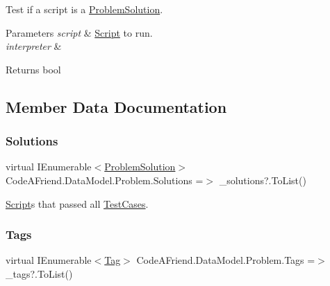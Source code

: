 Test if a script is a \mbox{\hyperlink{class_code_a_friend_1_1_data_model_1_1_problem_solution}{Problem\+Solution}}. 


\begin{DoxyParams}{Parameters}
{\em script} & \mbox{\hyperlink{class_code_a_friend_1_1_data_model_1_1_script}{Script}} to run.\\
\hline
{\em interpreter} & \\
\hline
\end{DoxyParams}
\begin{DoxyReturn}{Returns}
bool
\end{DoxyReturn}


\subsection{Member Data Documentation}
\mbox{\label{class_code_a_friend_1_1_data_model_1_1_problem_a3bebdf4e45042e9476fd7ae7cf38738b}} 
\subsubsection{\texorpdfstring{Solutions}{Solutions}}
{\footnotesize\ttfamily virtual I\+Enumerable$<$\mbox{\hyperlink{class_code_a_friend_1_1_data_model_1_1_problem_solution}{Problem\+Solution}}$>$ Code\+A\+Friend.\+Data\+Model.\+Problem.\+Solutions =$>$ \+\_\+solutions?.To\+List()}



\mbox{\hyperlink{class_code_a_friend_1_1_data_model_1_1_script}{Script}}s that passed all \mbox{\hyperlink{class_code_a_friend_1_1_data_model_1_1_problem_af4a665cdf0e4349c57e8588e95ad9717}{Test\+Cases}}.

\mbox{\label{class_code_a_friend_1_1_data_model_1_1_problem_ad5c3e1b321171d7c7723df70e99cf88d}} 
\subsubsection{\texorpdfstring{Tags}{Tags}}
{\footnotesize\ttfamily virtual I\+Enumerable$<$\mbox{\hyperlink{class_code_a_friend_1_1_data_model_1_1_tag}{Tag}}$>$ Code\+A\+Friend.\+Data\+Model.\+Problem.\+Tags =$>$ \+\_\+tags?.To\+List()}



